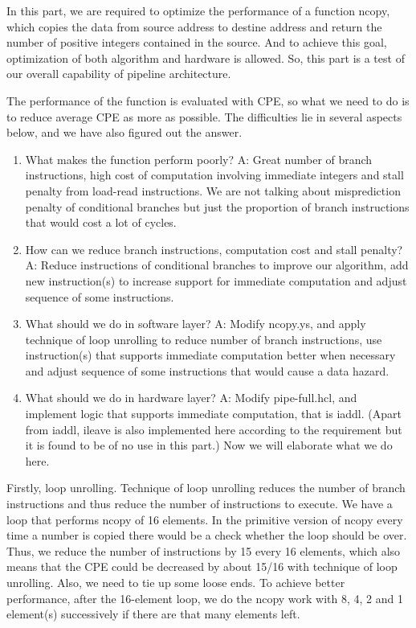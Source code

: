 \documentclass{article}
\begin{document}
   \par In this part, we are required to optimize the performance of a function ncopy, which copies the data from source address to destine address and return the number of positive integers contained in the source. And to achieve this goal, optimization of both algorithm and hardware is allowed. So, this part is a test of our overall capability of pipeline architecture.
    \par  The performance of the function is evaluated with CPE, so what we need to do is to reduce average CPE as more as possible. The difficulties lie in several aspects below, and we have also figured out the answer.
\begin{enumerate}
    \item
	What makes the function perform poorly? A: Great number of branch instructions, high cost of computation involving immediate integers and stall penalty from load-read instructions. We are not talking about misprediction penalty of conditional branches but just the proportion of branch instructions that would cost a lot of cycles.
    \item
	How can we reduce branch instructions, computation cost and stall penalty? A: Reduce instructions of conditional branches to improve our algorithm, add new instruction(s) to increase support for immediate computation and adjust sequence of some instructions.
    \item
	What should we do in software layer? A: Modify ncopy.ys, and apply technique of loop unrolling to reduce number of branch instructions, use instruction(s) that supports immediate computation better when necessary and adjust sequence of some instructions that would cause a data hazard.
    \item
	What should we do in hardware layer? A: Modify pipe-full.hcl, and implement logic that supports immediate computation, that is iaddl. (Apart from iaddl, ileave is also implemented here according to the requirement but it is found to be of no use in this part.)
Now we will elaborate what we do here.
\end{enumerate}
	   \par Firstly, loop unrolling. Technique of loop unrolling reduces the number of branch instructions and thus reduce the number of instructions to execute. We have a loop that performs ncopy of 16 elements. In the primitive version of ncopy every time a number is copied there would be a check whether the loop should be over. Thus, we reduce the number of instructions by 15 every 16 elements, which also means that the CPE could be decreased by about 15/16 with technique of loop unrolling. Also, we need to tie up some loose ends. To achieve better performance, after the 16-element loop, we do the ncopy work with 8, 4, 2 and 1 element(s) successively if there are that many elements left.
\end{document}
